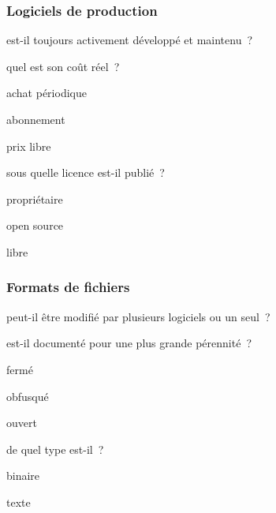 \subsubsection{Logiciels de production}

\begin{itmz}
\item{est-il toujours activement développé et maintenu ?}
\item{quel est son coût réel ?
    \begin{itmz}
    \item{achat périodique}
    \item{abonnement}
    \item{prix libre}
    \end{itmz}
}
\item{sous quelle licence est-il publié ?
    \begin{itmz}
    \item{propriétaire}
    \item{open source}
    \item{libre}
    \end{itmz}
}
\end{itmz}

\subsubsection{Formats de fichiers}

\begin{itmz}
\item{peut-il être modifié par plusieurs logiciels ou un seul ?}
\item{est-il documenté pour une plus grande pérennité ?
    \begin{itmz}
    \item{fermé}
    \item{obfusqué}
    \item{ouvert}
    \end{itmz}
}
\item{de quel type est-il ?
    \begin{itmz}
    \item{binaire}
    \item{texte}
    \end{itmz}
}
\end{itmz}

\pagebreak
